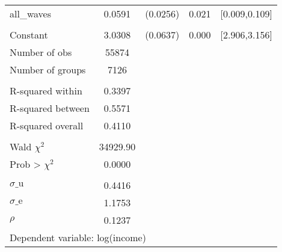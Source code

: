 {\begin{tabular}{l*{1}{cccc}}
all\_waves           &      0.0591&    (0.0256)&       0.021&[0.009,0.109]\\
                    &            &            &            &            \\
Constant            &      3.0308&    (0.0637)&       0.000&[2.906,3.156]\\
\midrule
Number of obs       &       55874&            &            &            \\
Number of groups    &        7126&            &            &            \\
\\ R-squared within &      0.3397&            &            &            \\
R-squared between   &      0.5571&            &            &            \\
R-squared overall   &      0.4110&            &            &            \\
\\ Wald $\chi^2$    &    34929.90&            &            &            \\
Prob > $\chi^2$     &      0.0000&            &            &            \\
\\ $\sigma\text{\_u}$&      0.4416&            &            &            \\
$\sigma\text{\_e}$   &      1.1753&            &            &            \\
$\rho$              &      0.1237&            &            &            \\
\bottomrule
\multicolumn{5}{l}{\footnotesize Dependent variable: log(income)}\\
\end{tabular}
}
